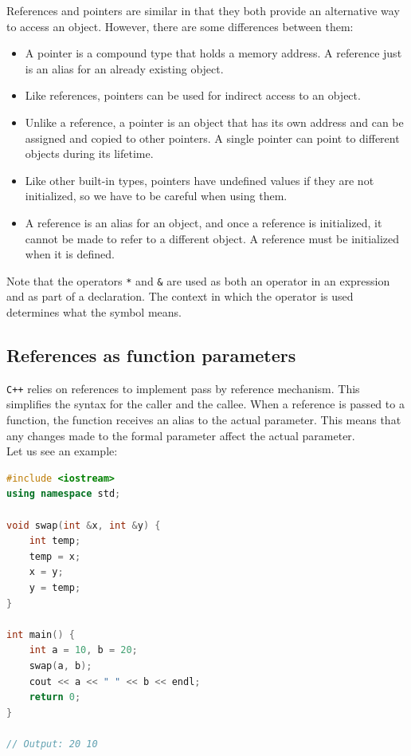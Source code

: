References and pointers are similar in that they both provide an alternative way
to access an object. However, there are some differences between them:

\begin{itemize}
    \item A pointer is a compound type that holds a memory address. A reference
    just is an alias for an already existing object.
    \item Like references, pointers can be used for indirect access to an object.
    \item Unlike a reference, a pointer is an object that has its own address and
    can be assigned and copied to other pointers. A single pointer can point to
    different objects during its lifetime.
    \item Like other built-in types, pointers have undefined values if they are
    not initialized, so we have to be careful when using them.
    \item A reference is an alias for an object, and once a reference is initialized,
    it cannot be made to refer to a different object. A reference must be initialized
    when it is defined.
\end{itemize}

Note that the operators \texttt{*} and \texttt{\&} are used as both an operator in an
expression and as part of a declaration. The context in which the operator is used
determines what the symbol means.

\subsection{References as function parameters}

\texttt{C++} relies on references to implement pass by reference mechanism. This
simplifies the syntax for the caller and the callee. When a reference is passed
to a function, the function receives an alias to the actual parameter. This means
that any changes made to the formal parameter affect the actual parameter.\\

Let us see an example:\\

\begin{lstlisting}[language=C++]
#include <iostream>
using namespace std;

void swap(int &x, int &y) {
    int temp;
    temp = x;
    x = y;
    y = temp;
}

int main() {
    int a = 10, b = 20;
    swap(a, b);
    cout << a << " " << b << endl;
    return 0;
}

// Output: 20 10
\end{lstlisting}

